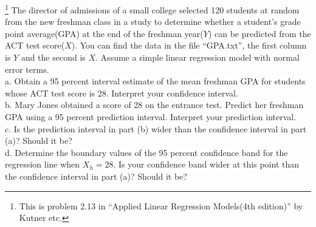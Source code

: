 \documentclass[12pt]{article}
\begin{document}
 {\footnote[2]{This is
problem 2.13 in ``Applied Linear Regression Models(4th edition)'' by
Kutner etc.} 
The director of admissions of a small college selected 120 students at
random from the new freshman class in a study to determine whether a student's grade
point average(GPA) at the end of the freshman year($Y$) can be predicted from the ACT
test score($X$). You can find the data in the file ``GPA.txt'', the first column is $Y$ and the
second is $X$. Assume a simple linear regression model with normal error terms.\\
a. Obtain a 95 percent interval estimate of the mean freshman GPA for students whose ACT
test score is 28. Interpret your confidence interval.\\
b. Mary Jones obtained a score of 28 on the entrance test. Predict her freshman GPA using a 95 percent prediction interval. Interpret your prediction interval.\\
c. Is the prediction interval in part (b) wider than the confidence interval in part (a)? Should
it be?\\
d. Determine the boundary values of the 95 percent confidence band for the regression line
when $X_h = 28$. Is your confidence band wider at this point than the confidence interval in
part (a)? Should it be?
   }
 { \vfill
  \answer
} { }
\end{document}
